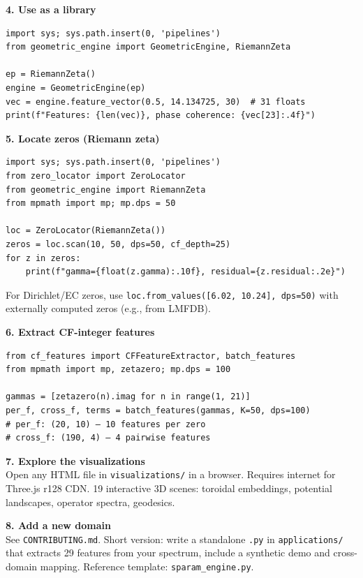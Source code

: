 \documentclass[10pt]{article}
\begin{document}
\vspace{4pt}
\noindent\textbf{4. Use as a library}
\begin{Verbatim}[fontsize=\small, frame=single]
import sys; sys.path.insert(0, 'pipelines')
from geometric_engine import GeometricEngine, RiemannZeta

ep = RiemannZeta()
engine = GeometricEngine(ep)
vec = engine.feature_vector(0.5, 14.134725, 30)  # 31 floats
print(f"Features: {len(vec)}, phase coherence: {vec[23]:.4f}")
\end{Verbatim}

\vspace{4pt}
\noindent\textbf{5. Locate zeros (Riemann zeta)}
\begin{Verbatim}[fontsize=\small, frame=single]
import sys; sys.path.insert(0, 'pipelines')
from zero_locator import ZeroLocator
from geometric_engine import RiemannZeta
from mpmath import mp; mp.dps = 50

loc = ZeroLocator(RiemannZeta())
zeros = loc.scan(10, 50, dps=50, cf_depth=25)
for z in zeros:
    print(f"gamma={float(z.gamma):.10f}, residual={z.residual:.2e}")
\end{Verbatim}
For Dirichlet/EC zeros, use \verb|loc.from_values([6.02, 10.24], dps=50)|
with externally computed zeros (e.g., from LMFDB).

\vspace{4pt}
\noindent\textbf{6. Extract CF-integer features}
\begin{Verbatim}[fontsize=\small, frame=single]
from cf_features import CFFeatureExtractor, batch_features
from mpmath import mp, zetazero; mp.dps = 100

gammas = [zetazero(n).imag for n in range(1, 21)]
per_f, cross_f, terms = batch_features(gammas, K=50, dps=100)
# per_f: (20, 10) — 10 features per zero
# cross_f: (190, 4) — 4 pairwise features
\end{Verbatim}

\vspace{4pt}
\noindent\textbf{7. Explore the visualizations}\\
Open any HTML file in \texttt{visualizations/} in a browser. Requires
internet for Three.js r128 CDN. 19 interactive 3D scenes: toroidal
embeddings, potential landscapes, operator spectra, geodesics.

\vspace{4pt}
\noindent\textbf{8. Add a new domain}\\
See \texttt{CONTRIBUTING.md}. Short version: write a standalone
\texttt{.py} in \texttt{applications/} that extracts 29 features from
your spectrum, include a synthetic demo and cross-domain mapping.
Reference template: \texttt{sparam\_engine.py}.
\end{document}
